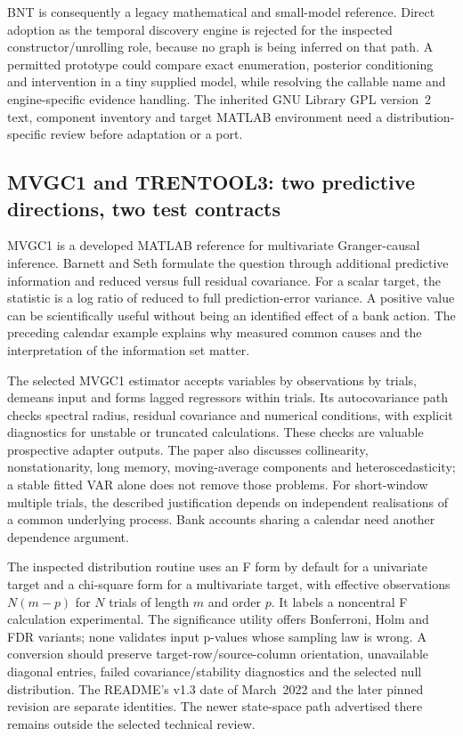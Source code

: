 BNT is consequently a legacy mathematical and small-model reference.
Direct adoption as the temporal discovery engine is rejected for the
inspected constructor/unrolling role, because no graph is being inferred on
that path. A permitted prototype could compare exact enumeration, posterior
conditioning and intervention in a tiny supplied model, while resolving the
callable name and engine-specific evidence handling. The inherited GNU
Library GPL version~2 text, component inventory and target MATLAB environment
need a distribution-specific review before adaptation or a port.
\citep{exec17_temporal_bnt}

\subsection{MVGC1 and TRENTOOL3: two predictive directions, two test contracts}

MVGC1 is a developed MATLAB reference for multivariate Granger-causal
inference. Barnett and Seth formulate the question through additional
predictive information and reduced versus full residual covariance.
For a scalar target, the statistic is a log ratio of reduced to full
prediction-error variance. A positive value can be scientifically useful
without being an identified effect of a bank action. The preceding calendar
example explains why measured common causes and the interpretation of the
information set matter.
\citep{exec17_temporal_mvgc_paper}

The selected MVGC1 estimator accepts variables by observations by trials,
demeans input and forms lagged regressors within trials. Its autocovariance
path checks spectral radius, residual covariance and numerical conditions,
with explicit diagnostics for unstable or truncated calculations. These
checks are valuable prospective adapter outputs. The paper also discusses
collinearity, nonstationarity, long memory, moving-average components and
heteroscedasticity; a stable fitted VAR alone does not remove those problems.
For short-window multiple trials, the described justification depends on
independent realisations of a common underlying process. Bank accounts sharing
a calendar need another dependence argument.
\citep{exec17_temporal_mvgc,exec17_temporal_mvgc_paper}

The inspected distribution routine uses an F form by default for a
univariate target and a chi-square form for a multivariate target, with
effective observations $N(m-p)$ for $N$ trials of length $m$ and order $p$.
It labels a noncentral F calculation experimental. The significance utility
offers Bonferroni, Holm and FDR variants; none validates input p-values whose
sampling law is wrong. A conversion should preserve target-row/source-column
orientation, unavailable diagonal entries, failed covariance/stability
diagnostics and the selected null distribution.
The README's v1.3 date of March~2022 and the later pinned revision are separate
identities. The newer state-space path advertised there remains outside the
selected technical review.
\citep{exec17_temporal_mvgc}

